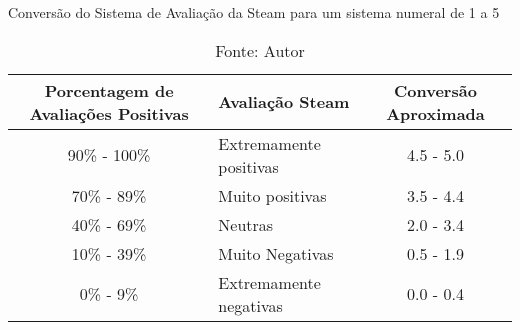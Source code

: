 \begin{table}[H]
	\caption{Conversão do Sistema de Avaliação da Steam para um sistema numeral de 1 a 5}
	\label{tab:avalicao_steam}
	\centering
	\footnotesize
	\begin{tabular}{clc}
		\toprule
		\textbf{Porcentagem de Avaliações Positivas} & \textbf{Avaliação Steam} & \textbf{Conversão Aproximada} \\
		\midrule
		90\% - 100\%                                 & Extremamente positivas   & 4.5 - 5.0                     \\
		70\% - 89\%                                  & Muito positivas          & 3.5 - 4.4                     \\
		40\% - 69\%                                  & Neutras                  & 2.0 - 3.4                     \\
		10\% - 39\%                                  & Muito Negativas          & 0.5 - 1.9                     \\
		0\% -  9\%                                   & Extremamente negativas   & 0.0 - 0.4                     \\
		\bottomrule
	\end{tabular}
	\caption*{Fonte: Autor}
\end{table}
